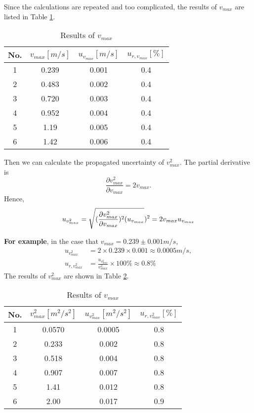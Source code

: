     Since the calculations are repeated and too complicated, the results of $v_{max}$ are listed in Table \ref{vadata1}.
    \begin{table}[!h] \small
        \centering
        \begin{tabular}{|c|c|c|c|}
            \hline
            No. & $v_{max}[m/s]$ & $u_{v_{max}}[m/s]$ & $u_{r,v_{max}}[\%]$\\ \hline
            1 & 0.239 & 0.001 & 0.4\\ \hline
            2 & 0.483 & 0.002 & 0.4\\ \hline
            3 & 0.720 & 0.003 & 0.4\\ \hline
            4 & 0.952 & 0.004 & 0.4\\ \hline
            5 & 1.19 & 0.005 & 0.4\\ \hline
            6 & 1.42 & 0.006 & 0.4\\ \hline
        \end{tabular}
        \caption{Results of $v_{max}$}\label{vadata1}
    \end{table}

    Then we can calculate the propagated uncertainty of $v_{max}^2$. The partial derivative is
    \[
        \frac{\partial v_{max}^2}{\partial v_{max}}=2v_{max}.
    \]
    Hence,
    \[
        u_{v_{max}^2}=\sqrt{(\frac{\partial v_{max}^2}{\partial v_{max}})^2(u_{v_{max}}})^2=2v_{max}u_{v_{max}}\\[0.4cm]
    \]

    \textbf{For example}, in the case that $v_{max}=0.239\pm 0.001m/s$,
    \[
    \begin{split}
        u_{v_{max}^2}&=2\times0.239\times0.001\approx0.0005m/s,\\
        u_{r,v_{max}^2}&=\frac{u_{v_{max}^2}}{v_{max}^2}\times100\%\approx0.8\%
    \end{split}
    \]
    The results of $v_{max}^2$ are shown in Table \ref{vadata2}.
    \begin{table}[!h] \small
        \centering
        \begin{tabular}{|c|c|c|c|}
            \hline
            No. & $v_{max}^2[m^2/s^2]$ & $u_{v_{max}^2}[m^2/s^2]$ & $u_{r,v_{max}^2}[\%]$\\ \hline
            1 & 0.0570 & 0.0005 & 0.8\\ \hline
            2 & 0.233 & 0.002 & 0.8\\ \hline
            3 & 0.518 & 0.004 & 0.8\\ \hline
            4 & 0.907 & 0.007 & 0.8\\ \hline
            5 & 1.41 & 0.012 & 0.8\\ \hline
            6 & 2.00 & 0.017 & 0.9\\ \hline
        \end{tabular}
        \caption{Results of $v_{max}$}\label{vadata2}
    \end{table}


